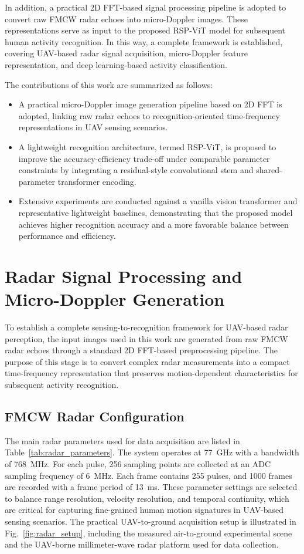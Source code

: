 \documentclass{svproc}
\begin{document}
In addition, a practical 2D FFT-based signal processing pipeline is adopted to convert raw FMCW radar echoes into micro-Doppler images. These representations serve as input to the proposed RSP-ViT model for subsequent human activity recognition. In this way, a complete framework is established, covering UAV-based radar signal acquisition, micro-Doppler feature representation, and deep learning-based activity classification.

The contributions of this work are summarized as follows:
\begin{itemize}
\item A practical micro-Doppler image generation pipeline based on 2D FFT is adopted, linking raw radar echoes to recognition-oriented time-frequency representations in UAV sensing scenarios.
\item A lightweight recognition architecture, termed RSP-ViT, is proposed to improve the accuracy-efficiency trade-off under comparable parameter constraints by integrating a residual-style convolutional stem and shared-parameter transformer encoding.
\item Extensive experiments are conducted against a vanilla vision transformer and representative lightweight baselines, demonstrating that the proposed model achieves higher recognition accuracy and a more favorable balance between performance and efficiency.
\end{itemize}



\section{Radar Signal Processing and Micro-Doppler Generation}

To establish a complete sensing-to-recognition framework for UAV-based radar perception, the input images used in this work are generated from raw FMCW radar echoes through a standard 2D FFT-based preprocessing pipeline. The purpose of this stage is to convert complex radar measurements into a compact time-frequency representation that preserves motion-dependent characteristics for subsequent activity recognition.


\subsection{FMCW Radar Configuration}

The main radar parameters used for data acquisition are listed in Table~\ref{tab:radar_parameters}. The system operates at 77~GHz with a bandwidth of 768~MHz. For each pulse, 256 sampling points are collected at an ADC sampling frequency of 6~MHz. Each frame contains 255 pulses, and 1000 frames are recorded with a frame period of 13~ms. These parameter settings are selected to balance range resolution, velocity resolution, and temporal continuity, which are critical for capturing fine-grained human motion signatures in UAV-based sensing scenarios. The practical UAV-to-ground acquisition setup is illustrated in Fig.~\ref{fig:radar_setup}, including the measured air-to-ground experimental scene and the UAV-borne millimeter-wave radar platform used for data collection.
\end{document}
